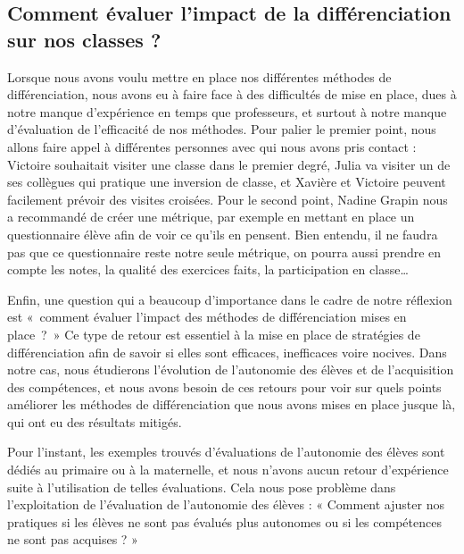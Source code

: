 
\subsection{Comment évaluer l'impact de la différenciation sur nos classes ?}


Lorsque nous avons voulu mettre en place nos différentes méthodes de différenciation, nous avons eu à faire face à des difficultés de mise en place, dues à notre manque d’expérience en temps que professeurs, et surtout à notre manque d’évaluation de l’efficacité de nos méthodes. Pour palier le premier point, nous allons faire appel à différentes personnes avec qui nous avons pris contact : Victoire souhaitait visiter une classe dans le premier degré, Julia va visiter un de ses collègues qui pratique une inversion de classe, et Xavière et Victoire peuvent facilement prévoir des visites croisées. Pour le second point, Nadine Grapin nous a recommandé de créer une métrique, par exemple en mettant en place un questionnaire élève afin de voir ce qu’ils en pensent. Bien entendu, il ne faudra pas que ce questionnaire reste notre seule métrique, on pourra aussi prendre en compte les notes, la qualité des exercices faits, la participation en classe…

Enfin, une question qui a beaucoup d’importance dans le cadre de notre réflexion est « comment évaluer l’impact des méthodes de différenciation mises en place ? » Ce type de retour est essentiel à la mise en place de stratégies de différenciation afin de savoir si elles sont efficaces, inefficaces voire nocives. Dans notre cas, nous étudierons l’évolution de l’autonomie des élèves et de l’acquisition des compétences, et nous avons besoin de ces retours pour voir sur quels points améliorer les méthodes de différenciation que nous avons mises en place jusque là, qui ont eu des résultats mitigés.

Pour l’instant, les exemples trouvés d’évaluations de l’autonomie des élèves sont dédiés au primaire ou à la maternelle, et nous n’avons aucun retour d’expérience suite à l’utilisation de telles évaluations. Cela nous pose problème dans l’exploitation de l’évaluation de l’autonomie des élèves : « Comment ajuster nos pratiques si les élèves ne sont pas évalués plus autonomes ou si les compétences ne sont pas acquises ? »

